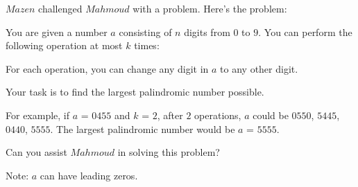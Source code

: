 $Mazen$ challenged $Mahmoud$ with a problem. Here's the problem:

You are given a number $a$ consisting of $n$ digits from $0$ to $9$. You can perform the following operation at most $k$ times:

For each operation, you can change any digit in $a$ to any other digit.

Your task is to find the largest palindromic number possible.

For example, if $a$ = $0455$ and $k$ = $2$, after $2$ operations, $a$ could be {$0550$, $5445$, $0440$, $5555$}. The largest palindromic number would be $a$ = $5555$.

Can you assist $Mahmoud$ in solving this problem?

Note: $a$ can have leading zeros.
